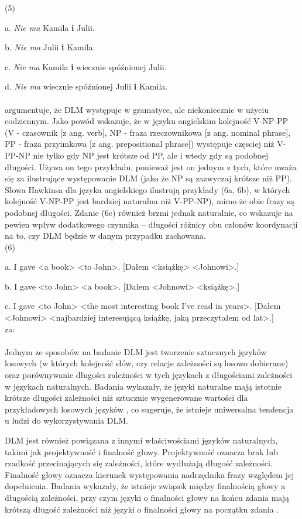 \documentclass[licencjacka]{pracamgr_Kogni}
\begin{document}
(5)

a. \textit{Nie ma} Kamila \textbf{i} Julii.

b. \textit{Nie ma} Julii \textbf{i} Kamila.

c. \textit{Nie ma} Kamila \textbf{i} wiecznie spóźnionej Julii.

d. \textit{Nie ma} wiecznie spóźnionej Julii \textbf{i} Kamila.
\\
\\
\citet{Hawkins1994} argumentuje, że DLM występuje w gramatyce, ale niekoniecznie w użyciu codziennym. Jako powód wskazuje, że w języku angielskim kolejność V-NP-PP (V - czasownik [z ang. verb], NP - fraza rzeczownikowa [z ang. nominal phrase], PP - fraza przyimkowa [z ang. prepositional phrase]) występuje częsciej niż V-PP-NP nie tylko gdy NP jest krótsze od PP, ale i wtedy gdy są podobnej długości. Używa on tego przykładu, ponieważ jest on jednym z tych, które uważa się za ilustrujące występowanie DLM (jako że NP są zazwyczaj krótsze niż PP). Słowa Hawkinsa dla języka angielskiego ilustrują przykłady (6a, 6b), w których kolejność V-NP-PP jest bardziej naturalna niż V-PP-NP), mimo że obie frazy są podobnej długości. Zdanie (6c) również brzmi jednak naturalnie, co wskazuje na pewien wpływ dodatkowego czynnika --  długości różnicy obu członów koordynacji na to, czy DLM będzie w danym przypadku zachowana.
\\

(6)

a. I gave <a book> <to John>. [Dałem <książkę> <Johnowi>.]

b. I gave <to John> <a book>. [Dałem <Johnowi> <książkę>.]

c. I gave <to John> <the most interesting book I've read in years>. [Dałem <Johnowi> <najbardziej interesującą książkę, jaką przeczytałem od lat>.]\\
za: \citet{AnonimoweNieopublikowane}
\\
\\
Jednym ze sposobów na badanie DLM jest tworzenie sztucznych języków losowych (w których kolejność słów, czy relacje zależności są losowo dobierane) oraz porównywanie długości zależności w tych językach z długościami zależności w językach naturalnych. Badania wykazały, że języki naturalne mają istotnie krótsze długości zależności niż sztucznie wygenerowane wartości dla przykładowych losowych języków \citep{FutrellEtAl2015}, co sugeruje, że istnieje uniwersalna tendencja u ludzi do wykorzystywania DLM.

DLM jest również powiązana z innymi właściwościami języków naturalnych, takimi jak projektywność i finalność głowy. Projektywność oznacza brak lub rzadkość przecinających się zależności, które wydłużają długość zależności. Finalność głowy oznacza kierunek występowania nadrzędnika frazy względem jej dopełnienia. Badania wykazały, że istnieje związek między finalnością głowy a długością zależności, przy czym języki o finalności głowy na końcu zdania mają krótszą długość zależności niż języki o finalności głowy na początku zdania \citep{FutrellEtAl2015}.
\end{document}
